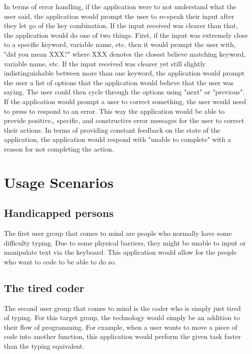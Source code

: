\documentclass[11pt, oneside]{article}
\begin{document}
In terms of error handling, if the application were to not understand what the user said, the application would prompt the user to re-speak their input after they let go of the key combination. If the input received was clearer than that, the application would do one of two things. First, if the input was extremely close to a specific keyword, variable name, etc. then it would prompt the user with, "did you mean XXX?" where XXX denotes the closest believe matching keyword, variable name, etc. If the input received was clearer yet still slightly indistinguishable between more than one keyword, the application would prompt the user a list of options that the application would believe that the user was saying. The user could then cycle through the options using "next" or "previous". If the application would prompt a user to correct something, the user would need to press  to respond to an error. This way the application would be able to provide positive,, specific, and constructive error messages for the user to correct their actions. In terms of providing constant feedback on the state of the application, the application would respond with "unable to complete" with a reason for not completing the action.

\section{Usage Scenarios}

	\subsection{Handicapped persons}
	The first user group that comes to mind are people who normally have some difficulty typing. Due to some physical barriers, they might be unable to input or manipulate text via the keyboard. This application would allow for the people who want to code to be able to do so. 

	\subsection{The tired coder}
	The second user group that comes to mind is the coder who is simply just tired of typing. For this target group, the technology would simply be an addition to their flow of programming. For example, when a user wants to move a piece of code into another function, this application would perform the given task faster than the typing equivalent.
\end{document}
